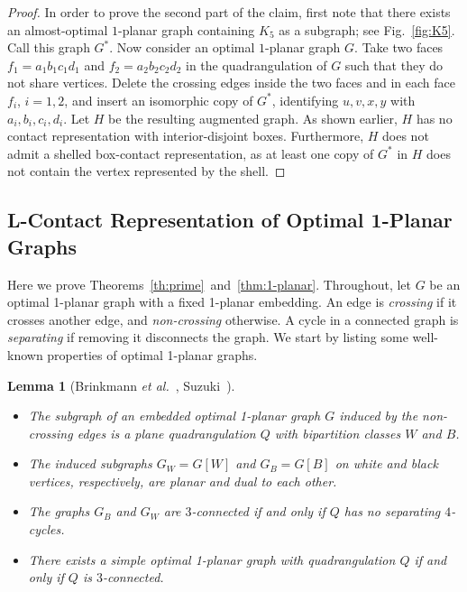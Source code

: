 \documentclass{article}
\newtheorem{lemma}[theorem]{Lemma}
\newcommand{\df}{\textit}
\begin{document}
\begin{proof}
In order to prove the second part of the claim, first note that there exists an almost-optimal $1$-planar
graph containing $K_5$ as a subgraph; see Fig.~\ref{fig:K5}. Call this graph $G^*$. Now consider an optimal $1$-planar
graph $G$. Take two faces $f_1=a_1b_1c_1d_1$ and $f_2=a_2b_2c_2d_2$ in the
quadrangulation of $G$ such that they do not share vertices. Delete the crossing
edges inside the two faces and in each face $f_i$, $i=1,2$, and insert an isomorphic copy
of $G^*$, identifying $u,v,x,y$ with $a_i,b_i,c_i,d_i$. Let $H$ be the resulting augmented graph.
As shown earlier, $H$ has no contact representation with interior-disjoint boxes.
Furthermore, $H$ does not admit a shelled box-contact representation, as
at least one copy of $G^*$ in $H$ does not contain the vertex represented by the shell.
\end{proof}


\subsection{L-Contact Representation of Optimal 1-Planar Graphs}

Here we prove Theorems~\ref{th:prime}~and~\ref{thm:1-planar}.
Throughout, let $G$ be an optimal 1-planar graph with a fixed 1-planar embedding.
An edge is \df{crossing} if it crosses another edge, and \df{non-crossing} otherwise.
A cycle in a connected graph is \df{separating} if removing it disconnects the graph.
We start by listing some well-known properties of optimal 1-planar graphs.




\begin{lemma}[Brinkmann \df{et al.}~\cite{BGGMT+05}, Suzuki~\cite{Suz10}]\label{lem:1-planar-subgraphs}{\ \\[-1em]}
 \begin{itemize}
  \item The subgraph of an embedded optimal 1-planar graph $G$ induced by the non-crossing edges is a plane quadrangulation $Q$ with bipartition classes $W$ and $B$.
  \item The induced subgraphs $G_W = G[W]$ and $G_B = G[B]$ on white and black vertices, respectively, are planar and dual to each other.
  \item The graphs $G_B$ and $G_W$ are $3$-connected if and only if $Q$ has no separating $4$-cycles.
  \item There exists a simple optimal 1-planar graph with quadrangulation $Q$ if and only if $Q$ is $3$-connected.
 \end{itemize}
\end{lemma}
\end{document}
